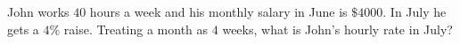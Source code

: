John works $40$ hours a week and his monthly salary in June is $\$4000$. In July he gets a $4\%$ raise. Treating a month as $4$ weeks, what is John's hourly rate in July?
